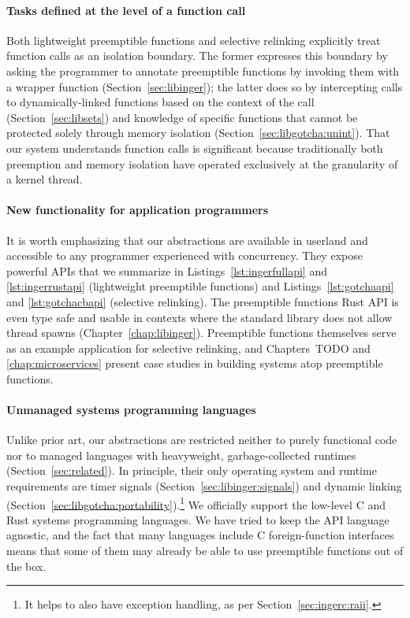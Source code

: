\paragraph{Tasks defined at the level of a function call}
Both lightweight preemptible functions and selective relinking explicitly treat
function calls as an isolation boundary.  The former expresses this boundary by
asking the programmer to annotate preemptible functions by invoking them with a
wrapper function (Section~\ref{sec:libinger}); the latter does so by intercepting
calls to dynamically-linked functions based on the context of the call
(Section~\ref{sec:libsets}) and knowledge of specific functions that cannot be
protected solely through memory isolation (Section~\ref{sec:libgotcha:unint}).  That
our system understands function calls is significant because traditionally both
preemption and memory isolation have operated exclusively at the granularity of a
kernel thread.

\paragraph{New functionality for application programmers}
It is worth emphasizing that our abstractions are available in userland and
accessible to any programmer experienced with concurrency.  They expose powerful APIs
that we summarize in Listings~\ref{lst:ingerfullapi} and \ref{lst:ingerrustapi}
(lightweight preemptible functions) and Listings~\ref{lst:gotchaapi} and
\ref{lst:gotchacbapi} (selective relinking).  The preemptible functions Rust API is
even type safe and usable in contexts where the standard library does not allow
thread spawns (Chapter~\ref{chap:libinger}).  Preemptible functions themselves serve
as an example application for selective relinking, and Chapters~TODO and
\ref{chap:microservices} present case studies in building systems atop preemptible
functions.

\paragraph{Unmanaged systems programming languages}
Unlike prior art, our abstractions are restricted neither to purely functional code
nor to managed languages with heavyweight, garbage-collected runtimes
(Section~\ref{sec:related}).  In principle, their only operating system and runtime
requirements are timer signals (Section~\ref{sec:libinger:signals}) and dynamic
linking (Section~\ref{sec:libgotcha:portability}).\footnote{It helps to also have
exception handling, as per Section~\ref{sec:ingerc:raii}.}  We officially support the
low-level C and Rust systems programming languages.  We have tried to keep the API
language agnostic, and the fact that many languages include C foreign-function
interfaces means that some of them may already be able to use preemptible functions
out of the box.

